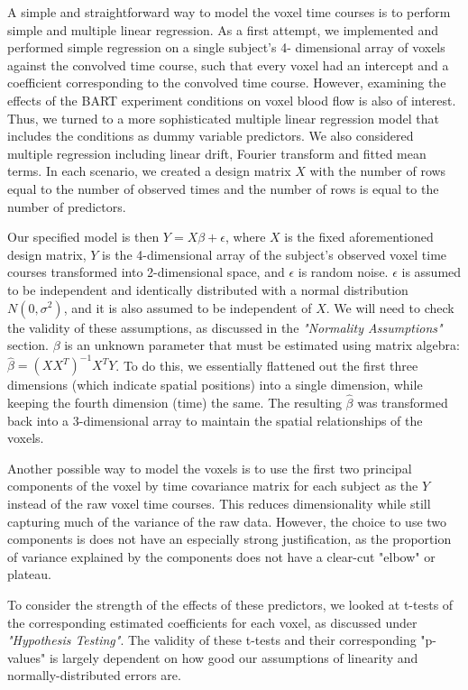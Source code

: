 \par \indent A simple and straightforward way to model the voxel time courses 
is to perform simple and multiple linear regression. As a first attempt, we 
implemented and performed simple regression on a single subject's 4-
dimensional array of voxels against the convolved time course, such that 
every voxel had an intercept and a coefficient corresponding to the convolved 
time course. However, examining the effects of the BART experiment conditions 
on voxel blood flow is also of interest. Thus, we turned to a more 
sophisticated multiple linear regression model that includes the conditions 
as dummy variable predictors. We also considered multiple regression including 
linear drift, Fourier transform and fitted mean terms. In each scenario, we 
created a design matrix $X$ with the number of rows equal to the number of 
observed times and the number of rows is equal to the number of predictors. 

Our specified model is then $Y = X\beta + \epsilon$, where $X$ is the fixed 
aforementioned design matrix, $Y$ is the 4-dimensional array of the subject's 
observed voxel time courses transformed into 2-dimensional space, and $\epsilon$ 
is random noise. $\epsilon$ is assumed to be independent and identically 
distributed with a normal distribution $N(0, \sigma^2)$, and it is also assumed 
to be independent of $X$. We will need to check the validity of these 
assumptions, as discussed in the \textit{"Normality Assumptions"} section. 
$\beta$ is an unknown parameter that must be estimated using matrix algebra: 
$\hat{\beta} = (X X^T)^{-1} X^T Y$. To do this, we essentially flattened out the 
first three dimensions (which indicate spatial positions) into a single dimension, 
while keeping the fourth dimension (time) the same. The resulting $\hat{\beta}$ 
was transformed back into a 3-dimensional array to maintain the spatial 
relationships of the voxels. 

\par Another possible way to model the voxels is to use the first two principal 
components of the voxel by time covariance matrix for each subject as the $Y$ 
instead of the raw voxel time courses. This reduces dimensionality while still 
capturing much of the variance of the raw data. However, the choice to use two 
components is does not have an especially strong justification, as the proportion 
of variance explained by the components does not have a clear-cut "elbow" or 
plateau. 

\par To consider the strength of the effects of these predictors, we looked 
at t-tests of the corresponding estimated coefficients for each voxel, as 
discussed under \textit{"Hypothesis Testing"}. The validity of these t-tests and 
their corresponding "p-values" is largely dependent on how good our assumptions 
of linearity and normally-distributed errors are. 

